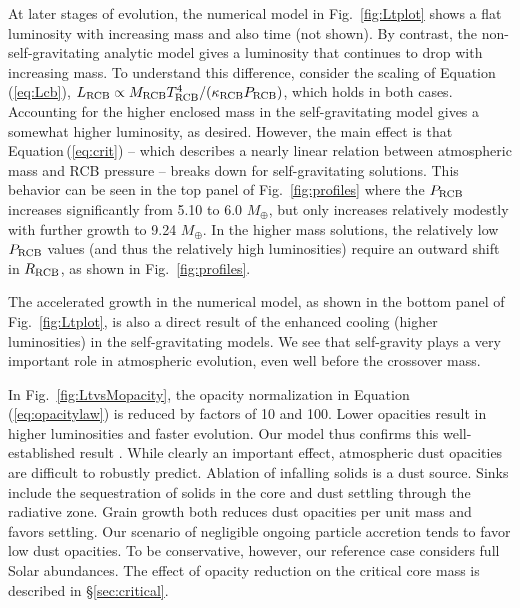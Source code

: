 \documentclass[apj, numberedappendix]{emulateapj}
\newcommand{\Eq}[1]{Equation\,(\ref{#1})}
\newcommand{\Fig}[1]{Fig.~\ref{#1}}
\newcommand{\cb}{_{\rm RCB}}
\begin{document}
At later stages of evolution, the numerical model in \Fig{fig:Ltplot} shows a flat luminosity with increasing mass and also time (not shown).  By contrast, the non-self-gravitating analytic model gives a luminosity that continues to drop with increasing mass.  To understand this difference, consider the scaling of \Eq{eq:Lcb}, $L\cb \propto M\cb T\cb^4/ (\kappa\cb  P\cb)$, which holds in both cases.   Accounting for the higher enclosed mass in the self-gravitating model gives a somewhat higher luminosity, as desired.  However, the main effect is that \Eq{eq:crit} -- which describes a nearly linear relation between atmospheric mass and RCB pressure --  breaks down for self-gravitating solutions.  This behavior can be seen in the top panel of \Fig{fig:profiles} where the $P\cb$ increases significantly from 5.10 to 6.0 $M_\oplus$, but only increases relatively modestly with further growth to 9.24 $M_\oplus$.   In the higher mass solutions, the relatively low $P\cb$ values (and thus the relatively high luminosities) require an outward shift in $R\cb$, as shown in \Fig{fig:profiles}.

The accelerated growth in the numerical model, as shown in the bottom panel of \Fig{fig:Ltplot}, is also a direct result of the enhanced cooling (higher luminosities) in the self-gravitating models.  We see that self-gravity plays a very important role in atmospheric evolution, even well before the crossover mass.
 


In \Fig{fig:LtvsMopacity}, the opacity normalization in \Eq{eq:opacitylaw} is reduced by factors of 10 and 100.  Lower opacities result in higher luminosities and faster evolution.  Our model thus confirms this well-established result \citep{HubBod05}.  While clearly an important effect, atmospheric dust opacities are difficult to robustly predict. Ablation of infalling solids is a dust source.  Sinks include the sequestration of solids in the core and dust settling through the radiative zone.  Grain growth both reduces dust opacities per unit mass and favors settling.  Our scenario of negligible ongoing particle accretion tends to favor low dust opacities.   To be conservative, however, our reference case considers full Solar abundances. The effect of opacity reduction on the critical core mass is described in \S\ref{sec:critical}. 
\end{document}
